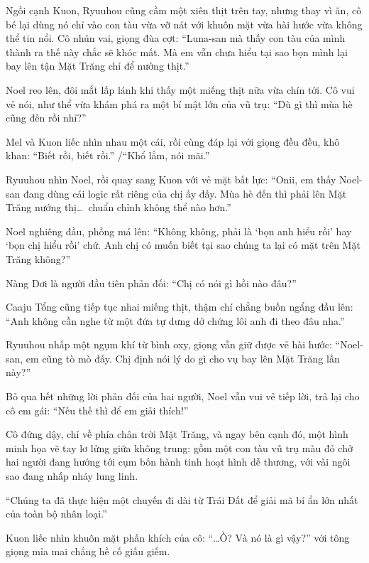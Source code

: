 \documentclass[../main.tex]{subfiles}
\begin{document}
Ngồi cạnh Kuon, Ryuuhou cũng cầm một xiên thịt trên tay, nhưng thay vì ăn, cô bé lại dùng nó chỉ vào con tàu vừa vỡ nát với khuôn mặt vừa hài hước vừa không thể tin nổi. Cô nhún vai, giọng đùa cợt: ``Luna-san mà thấy con tàu của mình thành ra thế này chắc sẽ khóc mất. Mà em vẫn chưa hiểu tại sao bọn mình lại bay lên tận Mặt Trăng chỉ để nướng thịt.''


Noel reo lên, đôi mắt lấp lánh khi thấy một miếng thịt nữa vừa chín tới. Cô vui vẻ nói, như thể vừa khám phá ra một bí mật lớn của vũ trụ: ``Dù gì thì mùa hè cũng đến rồi nhỉ?''

Mel và Kuon liếc nhìn nhau một cái, rồi cùng đáp lại với giọng đều đều, khô khan: ``Biết rồi, biết rồi.'' /``Khổ lắm, nói mãi.''

Ryuuhou nhìn Noel, rồi quay sang Kuon với vẻ mặt bất lực: ``Onii, em thấy Noel-san đang dùng cái logic rất riêng của chị ấy đấy. Mùa hè đến thì phải lên Mặt Trăng nướng thị\dots\ chuẩn chỉnh không thể nào hơn.''

Noel nghiêng đầu, phồng má lên: ``Không không, phải là `bọn anh hiểu rồi' hay `bọn chị hiểu rồi' chứ. Anh chị có muốn biết tại sao chúng ta lại có mặt trên Mặt Trăng không?''

Nàng Dơi là người đầu tiên phản đối: ``Chị có nói gì hồi nào đâu?''

Caaju Tổng cũng tiếp tục nhai miếng thịt, thậm chí chẳng buồn ngẩng đầu lên: ``Anh không cần nghe từ một đứa tự dưng dở chứng lôi anh đi theo đâu nha.''

Ryuuhou nhấp một ngụm khí từ bình oxy, giọng vẫn giữ được vẻ hài hước: ``Noel-san, em cũng tò mò đấy. Chị định nói lý do gì cho vụ bay lên Mặt Trăng lần này?''

Bỏ qua hết những lời phản đối của hai người, Noel vẫn vui vẻ tiếp lời, trả lại cho cô em gái: ``Nếu thế thì để em giải thích!''

Cô đứng dậy, chỉ về phía chân trời Mặt Trăng, và ngay bên cạnh đó, một hình minh họa vẽ tay lơ lửng giữa không trung: gồm một con tàu vũ trụ màu đỏ chở hai người đang hướng tới cụm bốn hành tinh hoạt hình dễ thương, với vài ngôi sao đang nhấp nháy lung linh.


``Chúng ta đã thực hiện một chuyến đi dài từ Trái Đất để giải mã bí ẩn lớn nhất của toàn bộ nhân loại.''

Kuon liếc nhìn khuôn mặt phấn khích của cô: ``\dots Ồ? Và nó là gì vậy?'' với tông giọng mỉa mai chẳng hề cố giấu giếm.
\end{document}
